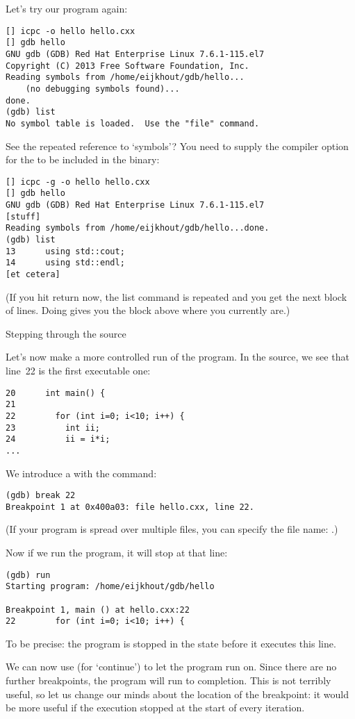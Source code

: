 Let's try our program again:
\begin{verbatim}
[] icpc -o hello hello.cxx
[] gdb hello
GNU gdb (GDB) Red Hat Enterprise Linux 7.6.1-115.el7
Copyright (C) 2013 Free Software Foundation, Inc.
Reading symbols from /home/eijkhout/gdb/hello...
    (no debugging symbols found)...
done.
(gdb) list
No symbol table is loaded.  Use the "file" command.
\end{verbatim}

See the repeated reference to `symbols'?
You need to supply the  compiler option for the 
to be included in the binary:
\begin{verbatim}
[] icpc -g -o hello hello.cxx
[] gdb hello
GNU gdb (GDB) Red Hat Enterprise Linux 7.6.1-115.el7
[stuff]
Reading symbols from /home/eijkhout/gdb/hello...done.
(gdb) list
13      using std::cout;
14      using std::endl;
[et cetera]
\end{verbatim}
(If you hit return now, the list command is repeated and you get the next block of lines.
Doing  gives you the block above where you currently are.)

 {Stepping through the source}

Let's now make a more controlled run of the program.
In the source, we see that line~22 is the first executable one:
\begin{lstlisting}
20      int main() {
21
22        for (int i=0; i<10; i++) {
23          int ii;
24          ii = i*i;
...
\end{lstlisting}

We introduce a  with the  command:
\begin{verbatim}
(gdb) break 22
Breakpoint 1 at 0x400a03: file hello.cxx, line 22.
\end{verbatim}
(If your program is spread over multiple files,
you can specify the file name: .)

Now if we run the program, it will stop at that line:
\begin{verbatim}
(gdb) run
Starting program: /home/eijkhout/gdb/hello

Breakpoint 1, main () at hello.cxx:22
22        for (int i=0; i<10; i++) {
\end{verbatim}
To be precise: the program is stopped in the state before it executes this line.

We can now use  (for `continue') to let the program run on.
Since there are no further breakpoints, the program will run to completion.
This is not terribly useful, so let us change our minds about the location of the breakpoint:
it would be more useful if the execution stopped at the start of every iteration.


